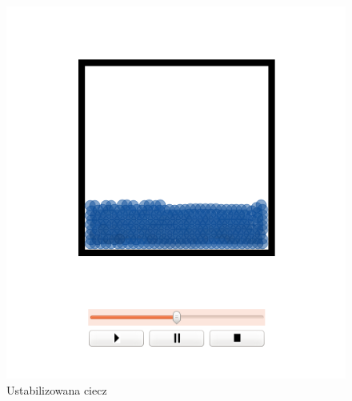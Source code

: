 \begin{minipage}{0.5\textwidth}
\begin{figure}[H]
 \begin{center}
  \includegraphics[width=\textwidth]{./rysunki/plasko_stabilny}
 \end{center}
 \caption{Ustabilizowana ciecz}
 \label{fig:plasko_stabilny}
\end{figure}
\end{minipage}\\[0.1cm]

